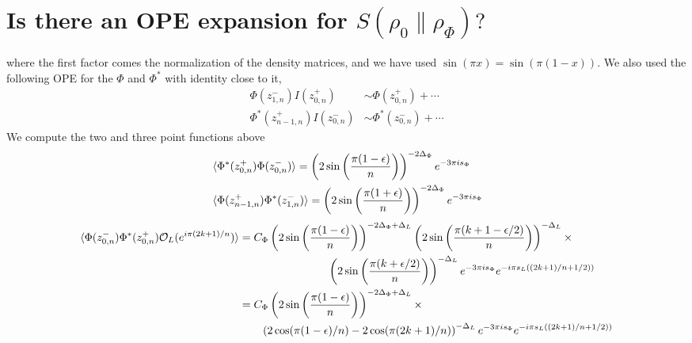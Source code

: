 \documentclass[11pt]{article}
\newcommand{\ep}{\epsilon}
\newcommand{\p}{\partial}
\newcommand{\mO}{\mathcal{O}}
\newcommand{\nn}{\nonumber}
\newcommand{\lb}{\left(}
\newcommand{\rb}{\right)}
\begin{document}
\section{\texorpdfstring{Is there an OPE expansion for $S(\rho_0\|\rho_\Phi)?$}{Is there an OPE expansion for S(rho0 || rho Phi}}

where the first factor comes the normalization of the density matrices, and we have used $\sin(\pi x)=\sin(\pi(1-x))$. We also used the following OPE for the $\Phi$ and $\Phi^*$ with identity close to it,
\begin{align}
    \Phi(z_{1,n}^-) I(z_{0,n}^+) &\sim \Phi(z_{0,n}^+) + \cdots 
    \nn\\
    \Phi^*(z_{n-1,n}^+)I(z_{0,n}^-) &\sim \Phi^*(z_{0,n}^-)+ \cdots 
\end{align}
We compute the two and three point functions above \
\begin{align}
 &\braket{\Phi^*(z^+_{0,n})\Phi(z^-_{0,n})}=\lb 2\sin\lb\frac{\pi(1-\ep)}{n}\rb\rb^{-2\Delta_\Phi}e^{-3\pi i s_\Phi}\\
  &\braket{\Phi(z^+_{n-1,n})\Phi^*(z^-_{1,n})}=\lb 2\sin\lb\frac{\pi(1+\ep)}{n}\rb\rb^{-2\Delta_\Phi}e^{-3\pi i s_\Phi}
\end{align}
\begin{align}
\braket{\Phi(z^-_{0,n})\Phi^*(z^+_{0,n})\mO_L(e^{i\pi(2k+1) /n})}&=C_\Phi\lb 2\sin\lb\frac{\pi(1-\ep)}{n}\rb\rb^{-2\Delta_\Phi+\Delta_L}\lb 2\sin\lb\frac{\pi(k+1-\ep/2)}{n}\rb\rb^{-\Delta_L}\times\nn\\
&\qquad \qquad \qquad \qquad\lb 2\sin\lb\frac{\pi(k+\ep/2)}{n}\rb\rb^{-\Delta_L}e^{-3\pi i s_\Phi}e^{-i\pi s_L\lb (2k+1)/n+1/2)\rb}\nn\\
&=C_\Phi\lb 2\sin\lb\frac{\pi(1-\ep)}{n}\rb\rb^{-2\Delta_\Phi+\Delta_L}\times\nn \\
&\qquad\lb2\cos(\pi(1-\ep)/n)-2\cos(\pi (2k+1)/n) \rb^{-\Delta_L}e^{-3\pi i s_\Phi}e^{-i\pi s_L\lb (2k+1)/n+1/2)\rb}
\end{align}
\end{document}
